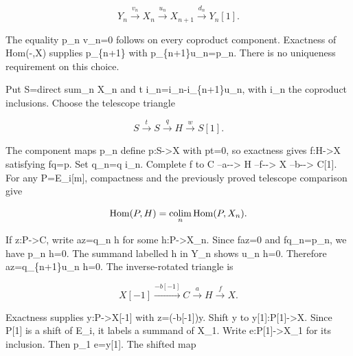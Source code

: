 \[
 Y_n\xrightarrow{v_n}X_n\xrightarrow{u_n}X_{n+1}
          \xrightarrow{d_n}Y_n[1].
\]

The equality p\_\allowbreak{}n v\_\allowbreak{}n\allowbreak{}=0 follows on every coproduct component. Exactness of Hom(-,\allowbreak{}X)\allowbreak{} supplies p\_\allowbreak{}\{n\allowbreak{}+1\} with p\_\allowbreak{}\{n\allowbreak{}+1\}u\_\allowbreak{}n\allowbreak{}=p\_\allowbreak{}n. There is no uniqueness requirement on this choice.

Put S\allowbreak{}=direct sum\_\allowbreak{}n X\_\allowbreak{}n and t i\_\allowbreak{}n\allowbreak{}=i\_\allowbreak{}n-i\_\allowbreak{}\{n\allowbreak{}+1\}u\_\allowbreak{}n,\allowbreak{} with i\_\allowbreak{}n the coproduct inclusions. Choose the telescope triangle

\[
 S\xrightarrow t S\xrightarrow q H\xrightarrow w S[1].
\]

The component maps p\_\allowbreak{}n define p:\allowbreak{}S\allowbreak{}->X with pt\allowbreak{}=0,\allowbreak{} so exactness gives f:\allowbreak{}H\allowbreak{}->X satisfying fq\allowbreak{}=p. Set q\_\allowbreak{}n\allowbreak{}=q i\_\allowbreak{}n. Complete f to C --a-\allowbreak{}-> H --f-\allowbreak{}-> X --b-\allowbreak{}-> C[1]\allowbreak{}. For any P\allowbreak{}=E\_\allowbreak{}i[m]\allowbreak{},\allowbreak{} compactness and the previously proved telescope comparison give

\[
 \operatorname{Hom}(P,H)=
 \mathop{\rm colim}_n\operatorname{Hom}(P,X_n).
\]

If z:\allowbreak{}P\allowbreak{}->C,\allowbreak{} write az\allowbreak{}=q\_\allowbreak{}n h for some h:\allowbreak{}P\allowbreak{}->X\_\allowbreak{}n. Since faz\allowbreak{}=0 and fq\_\allowbreak{}n\allowbreak{}=p\_\allowbreak{}n,\allowbreak{} we have p\_\allowbreak{}n h\allowbreak{}=0. The summand labelled h in Y\_\allowbreak{}n shows u\_\allowbreak{}n h\allowbreak{}=0. Therefore az\allowbreak{}=q\_\allowbreak{}\{n\allowbreak{}+1\}u\_\allowbreak{}n h\allowbreak{}=0. The inverse-rotated triangle is

\[
 X[-1]\xrightarrow{-b[-1]}C\xrightarrow a H\xrightarrow f X.
\]

Exactness supplies y:\allowbreak{}P\allowbreak{}->X[-1]\allowbreak{} with z\allowbreak{}=(-b[-1]\allowbreak{})\allowbreak{}y. Shift y to y[1]\allowbreak{}:\allowbreak{}P[1]\allowbreak{}\allowbreak{}->X. Since P[1]\allowbreak{} is a shift of E\_\allowbreak{}i,\allowbreak{} it labels a summand of X\_\allowbreak{}1. Write e:\allowbreak{}P[1]\allowbreak{}\allowbreak{}->X\_\allowbreak{}1 for its inclusion. Then p\_\allowbreak{}1 e\allowbreak{}=y[1]\allowbreak{}. The shifted map


